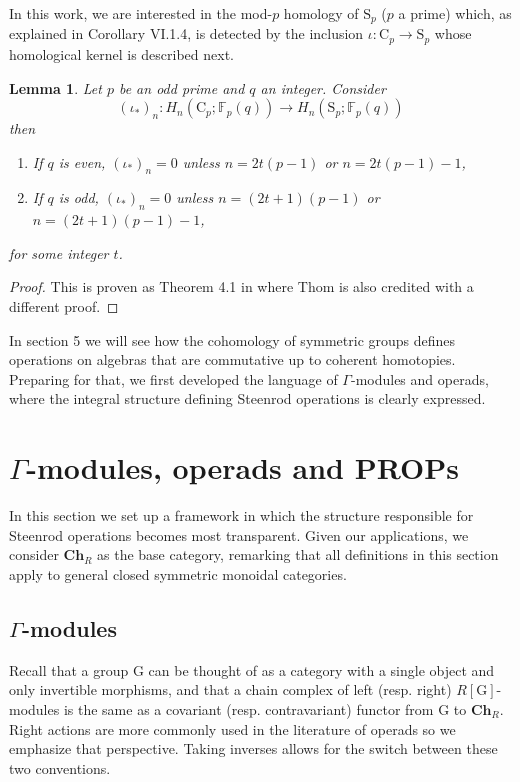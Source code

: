 \documentclass[A4]{amsart}
\newtheorem{lemma}[theorem]{Lemma}
\theoremstyle{definition}
\begin{document}
In this work, we are interested in the mod-$p$ homology of $\mathrm{S}_p$ ($p$ a prime) which, as explained in \cite{adem2004milgram} Corollary VI.1.4, is detected by the inclusion $\iota : \mathrm{C}_p \to \mathrm{S}_p$ whose homological kernel is described next.

\begin{lemma} \label{lem: Thom's theorem}
	Let $p$ be an odd prime and $q$ an integer. Consider
	\begin{equation*}
	(\iota_\ast)_n : H_n(\mathrm{C}_p; \mathbb{F}_p(q)) \to H_n(\mathrm{S}_p; \mathbb{F}_p(q))
	\end{equation*}
	then
	\begin{enumerate}
		\item If $q$ is even, $(\iota_\ast)_n = 0$ unless $n = 2t(p-1)$ or $n = 2t(p-1) - 1$,
		\item If $q$ is odd, $(\iota_\ast)_n = 0$ unless $n = (2t+1)(p-1)$ or $n = (2t+1)(p-1)-1$,
	\end{enumerate}
	for some integer $t$.
\end{lemma}

\begin{proof}
	This is proven as Theorem 4.1 in \cite{steenrod53cyclic} where Thom is also credited with a different proof.
\end{proof}

In section 5 we will see how the cohomology of symmetric groups defines operations on algebras that are commutative up to coherent homotopies. Preparing for that, we first developed the language of $\Gamma$-modules and operads, where the integral structure defining Steenrod operations is clearly expressed.

\section{$\Gamma$-modules, operads and PROPs}

In this section we set up a framework in which the structure responsible for Steenrod operations becomes most transparent. Given our applications, we consider $\mathbf{Ch}_R$ as the base category, remarking that all definitions in this section apply to general closed symmetric monoidal categories.

\subsection{$\Gamma$-modules}
Recall that a group $\mathrm G$ can be thought of as a category with a single object and only invertible morphisms, and that a chain complex of left (resp. right) $R[\mathrm G]$-modules is the same as a covariant (resp. contravariant) functor from $\mathrm G$ to $\mathbf{Ch}_R$. Right actions are more commonly used in the literature of operads so we emphasize that perspective. Taking inverses allows for the switch between these two conventions. 
\end{document}
